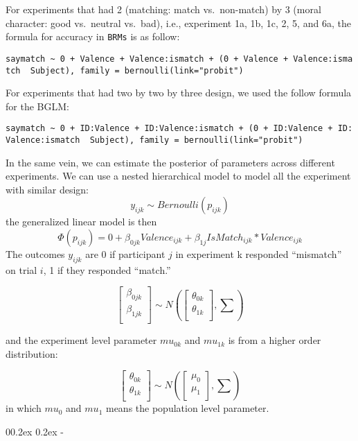 \documentclass[
  english,
  man]{apa6}
\makeatletter
\let\oldsubparagraph\subparagraph
\renewcommand{\subparagraph}[1]{\oldsubparagraph{#1}\mbox{}}
\renewcommand{\subparagraph}[1]{\@startsection{subparagraph}{5}{1em}%
  {0\baselineskip \@plus 0.2ex \@minus 0.2ex}%
  {-\z@\relax}%
  {\normalfont\normalsize\itshape\hspace{\parindent}{#1}\textit{\addperi}}{\relax}}
\makeatother
\begin{document}
For experiments that had 2 (matching: match vs.~non-match) by 3 (moral character: good vs.~neutral vs.~bad), i.e., experiment 1a, 1b, 1c, 2, 5, and 6a, the formula for accuracy in \texttt{BRMs} is as follow:

\texttt{saymatch\ \textasciitilde{}\ 0\ +\ Valence\ +\ Valence:ismatch\ +\ (0\ +\ Valence\ +\ Valence:ismatch\ \textbar{}\ Subject),\ family\ =\ bernoulli(link="probit")}

For experiments that had two by two by three design, we used the follow formula for the BGLM:

\texttt{saymatch\ \textasciitilde{}\ 0\ +\ ID:Valence\ +\ ID:Valence:ismatch\ +\ (0\ +\ ID:Valence\ +\ ID:Valence:ismatch\ \textbar{}\ Subject),\ family\ =\ bernoulli(link="probit")}

In the same vein, we can estimate the posterior of parameters across different experiments. We can use a nested hierarchical model to model all the experiment with similar design:
\[y_{ijk} \sim Bernoulli(p_{ijk})\]
the generalized linear model is then
\[ \Phi(p_{ijk}) =  0 + \beta_{0jk}Valence_{ijk} + \beta_{1j}IsMatch_{ijk} * Valence_{ijk}\]
The outcomes \(y_{ijk}\) are 0 if participant \(j\) in experiment k responded ``mismatch'' on trial \(i\), 1 if they responded ``match.''

\[\begin{bmatrix}\beta_{0jk}\\
\beta_{1jk}\\
\end{bmatrix} \sim N(\begin{bmatrix}\theta_{0k}\\
\theta_{1k}\\
\end{bmatrix}, \sum)\]

and the experiment level parameter \(mu_{0k}\) and \(mu_{1k}\) is from a higher order distribution:

\[\begin{bmatrix}\theta_{0k}\\
\theta_{1k}\\
\end{bmatrix} \sim N(\begin{bmatrix}\mu_{0}\\
\mu_{1}\\
\end{bmatrix}, \sum)\]
in which \(mu_{0}\) and \(mu_{1}\) means the population level parameter.

\hypertarget{reaction-times}{%
\subparagraph{Reaction times}\label{reaction-times}}
\end{document}
